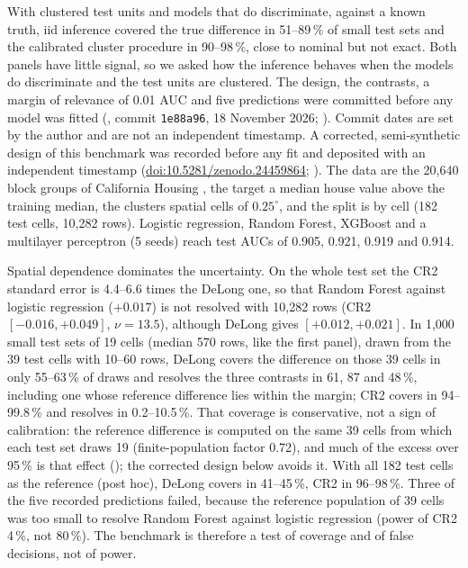 \documentclass[11pt,a4paper]{article}
\begin{document}
With clustered test units and models that do discriminate, against a known truth, iid inference covered the true difference in 51--89\,\% of small test sets and the calibrated cluster procedure in 90--98\,\%, close to nominal but not exact. Both panels have little signal, so we asked how the inference behaves when the models do discriminate and the test units are clustered. The design, the contrasts, a margin of relevance of 0.01 AUC and five predictions were committed before any model was fitted (, commit \texttt{1e88a96}, 18 November 2026; ). Commit dates are set by the author and are not an independent timestamp. A corrected, semi-synthetic design of this benchmark was recorded before any fit and deposited with an independent timestamp (\href{https://doi.org/10.5281/zenodo.24459864}{doi:10.5281/zenodo.24459864}; ). The data are the 20{,}640 block groups of California Housing \citep{pace1997}, the target a median house value above the training median, the clusters spatial cells of $0.25^\circ$, and the split is by cell (182 test cells, 10{,}282 rows). Logistic regression, Random Forest, XGBoost and a multilayer perceptron (5 seeds) reach test AUCs of 0.905, 0.921, 0.919 and 0.914.

Spatial dependence dominates the uncertainty. On the whole test set the CR2 standard error is 4.4--6.6 times the DeLong one, so that Random Forest against logistic regression ($+0.017$) is not resolved with 10{,}282 rows (CR2 $[-0.016,+0.049]$, $\nu=13.5$), although DeLong gives $[+0.012,+0.021]$. In 1{,}000 small test sets of 19 cells (median 570 rows, like the first panel), drawn from the 39 test cells with 10--60 rows, DeLong covers the difference on those 39 cells in only 55--63\,\% of draws and resolves the three contrasts in 61, 87 and 48\,\%, including one whose reference difference lies within the margin; CR2 covers in 94--99.8\,\% and resolves in 0.2--10.5\,\%. That coverage is conservative, not a sign of calibration: the reference difference is computed on the same 39 cells from which each test set draws 19 (finite-population factor 0.72), and much of the excess over 95\,\% is that effect (); the corrected design below avoids it. With all 182 test cells as the reference (post hoc), DeLong covers in 41--45\,\%, CR2 in 96--98\,\%. Three of the five recorded predictions failed, because the reference population of 39 cells was too small to resolve Random Forest against logistic regression (power of CR2 4\,\%, not 80\,\%). The benchmark is therefore a test of coverage and of false decisions, not of power.
\end{document}
